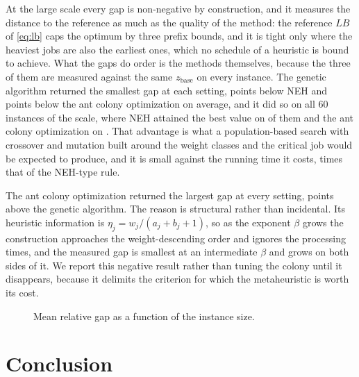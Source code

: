 \documentclass[12pt]{article}
\let\origsection\section
\renewcommand{\section}{\FloatBarrier\origsection}
\begin{document}
\begin{sloppypar}
At the large scale every gap is non-negative by construction, and it measures the distance to
the reference as much as the quality of the method: the reference $LB$ of \cref{eq:lb} caps
the optimum by three prefix bounds, and it is tight only where the heaviest jobs are also the
earliest ones, which no schedule of a heuristic is bound to achieve. What the gaps
do order is the methods themselves, because the three of them are measured against the same
$z_{\text{base}}$ on every instance. The genetic algorithm returned the smallest gap at each
setting, \TBD points below NEH and \TBD points below the ant colony
optimization on average, and it did so on all $60$ instances of the scale, where NEH
attained the best value on \TBD of them and the ant colony optimization on \TBD. That
advantage is what a population-based search with crossover and mutation built around the
weight classes and the critical job would be expected to produce, and it is small against
the running time it costs, \TBD times that of the NEH-type rule.

The ant colony optimization returned the largest gap at every setting, \TBD points
above the genetic algorithm. The reason is structural rather than incidental. Its heuristic
information is $\eta_j=w_j/(a_j+b_j+1)$, so as the exponent $\beta$ grows the construction
approaches the weight-descending order and ignores the processing times, and the measured
gap is smallest at an intermediate $\beta$ and grows on both sides of it. We report this
negative result rather than tuning the colony until it disappears, because it delimits the
criterion for which the metaheuristic is worth its cost.

\FloatBarrier
\begin{figure}[H]
\centering
{}
\caption{Mean relative gap as a function of the instance size.}
\label{fig:results-gap}
\end{figure}


\section{Conclusion}
\label{sec:conclusion}




\end{sloppypar}
\end{document}
